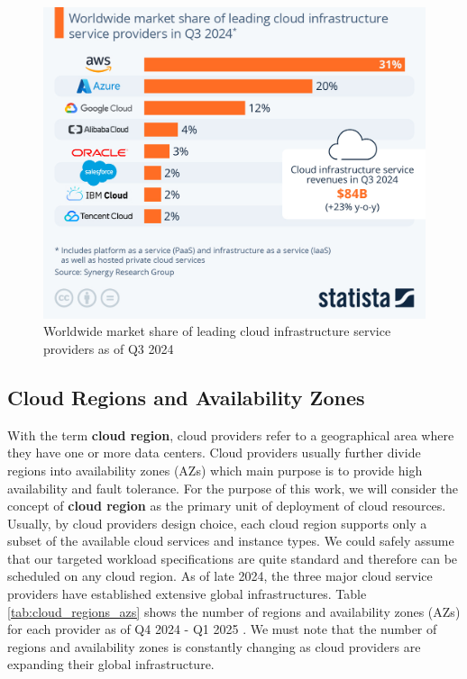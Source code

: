 \begin{figure}[htb]
    \centering
    \includegraphics[width=0.75\linewidth]{images/pcp.jpeg}
    \caption{Worldwide market share of leading cloud infrastructure service providers as of Q3 2024 \cite{statista_cloud_market_share}}
    \label{fig:pcp}
\end{figure}
  
\subsection{Cloud Regions and Availability Zones}

With the term \textbf{cloud region}, cloud providers refer to a geographical area where they have one or more data centers.
Cloud providers usually further divide regions into availability zones (AZs) which main purpose is to provide high availability and fault tolerance.
For the purpose of this work, we will consider the concept of \textbf{cloud region} as the primary unit of deployment of cloud resources.
Usually, by cloud providers design choice, each cloud region supports only a subset of the available cloud services and instance types.
We could safely assume that our targeted workload specifications are quite standard and therefore can be scheduled on any cloud region.
As of late 2024, the three major cloud service providers have established extensive global infrastructures.
Table \ref{tab:cloud_regions_azs} shows the number of regions and availability zones (AZs) for each provider as of Q4 2024 - Q1 2025
\cite{statista_cloud_regions} \cite{aws_infrastructure}.
We must note that the number of regions and availability zones is constantly changing as cloud providers are expanding their global infrastructure.

